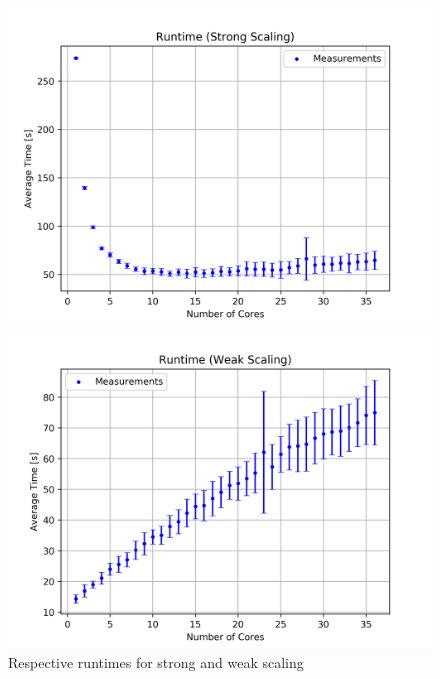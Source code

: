 \documentclass[12pt, a4paper, titlepage]{article}
\begin{document}
{\begin{figure}[htbp]
	\begin{minipage}{0.49\textwidth} 
	\includegraphics[width=\textwidth]{pictures/avg_strong.png}
	\end{minipage}
	\hfill
	\begin{minipage}{0.49\textwidth}
	\includegraphics[width=\textwidth]{pictures/avg_weak.png}
	\end{minipage}
	\label{fig:runtimes}
	\caption{Respective runtimes for strong and weak scaling}
	\label{fig:runtimes}
\end{figure}



}
\end{document}
